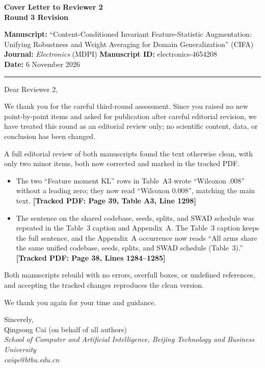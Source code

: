 \documentclass[11pt]{article}
\newcommand{\loc}[1]{\textbf{[\textcolor{revblue}{Tracked PDF: #1}]}}
\begin{document}
\begin{center}
{\Large\textbf{Cover Letter to Reviewer 2}}\\[0.5em]
\textbf{Round 3 Revision}
\end{center}

\textbf{Manuscript:} ``Content-Conditioned Invariant Feature-Statistic
Augmentation: Unifying Robustness and Weight Averaging for Domain
Generalization'' (CIFA)\\
\textbf{Journal:} \textit{Electronics} (MDPI)\qquad
\textbf{Manuscript ID:} electronics-4654208\\
\textbf{Date:} 6 November 2026

\hrule
\vspace{0.4em}

Dear Reviewer 2,

We thank you for the careful third-round assessment. Since you raised no new
point-by-point items and asked for publication after careful editorial
revision, we have treated this round as an editorial review only; no
scientific content, data, or conclusion has been changed.

A full editorial review of both manuscripts found the text otherwise clean,
with only two minor items, both now corrected and marked in the tracked PDF.

\begin{itemize}
\item The two ``Feature moment KL'' rows in Table~A3 wrote ``Wilcoxon .008''
without a leading zero; they now read ``Wilcoxon 0.008'', matching the main
text. \loc{Page 39, Table A3, Line 1298}

\item The sentence on the shared codebase, seeds, splits, and SWAD schedule
was repeated in the Table~3 caption and Appendix~A. The Table~3 caption keeps
the full sentence, and the Appendix~A occurrence now reads ``All arms share
the same unified codebase, seeds, splits, and SWAD schedule (Table~3).''
\loc{Page 38, Lines 1284--1285}
\end{itemize}

Both manuscripts rebuild with no errors, overfull boxes, or undefined
references, and accepting the tracked changes reproduces the clean version.

\vspace{0.6em}
We thank you again for your time and guidance.

\vspace{0.8em}
Sincerely,\\
Qingsong Cai (on behalf of all authors)\\
\textit{School of Computer and Artificial Intelligence, Beijing Technology and
Business University}\\
\textit{caiqs@btbu.edu.cn}
\end{document}
